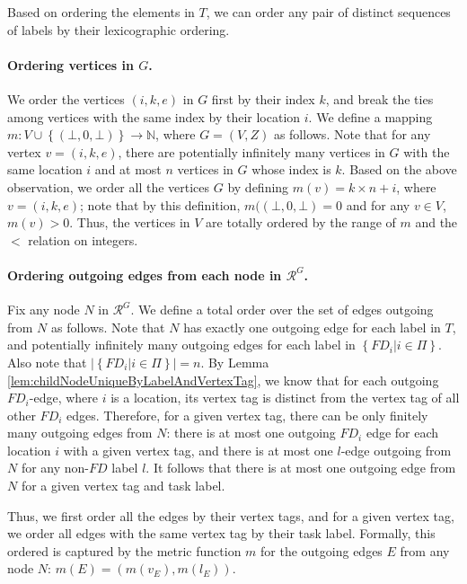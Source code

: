 \documentclass[11pt]{article}
\numberwithin{theorem}{section}
\newcommand{\set}[1]{\left\{#1\right\}}
\begin{document}
Based on ordering the elements in $T$, we can order any pair of distinct sequences of labels by their lexicographic ordering.

\paragraph{Ordering vertices in $G$.}
We order the vertices $(i,k,e)$ in $G$ first by their index $k$, and break the ties among vertices with the same index by their location $i$.
We define a mapping $m : V \cup \set{(\bot,0,\bot)} \rightarrow \mathbb{N}$, where $G = (V,Z)$ as follows. Note that for any vertex $v = (i,k,e)$, there are potentially infinitely many vertices in $G$ with the same location $i$ and at most $n$ vertices in $G$ whose index is $k$. Based on the above observation, we order all the vertices $G$ by defining $m(v) = k\times n + i$, where $v = (i,k,e)$; note that by this definition, $m((\bot, 0, \bot) = 0$ and for any $v \in V$, $m(v) > 0$. Thus, the vertices in $V$ are totally ordered by the range of $m$ and the $<$ relation on integers.

\paragraph{Ordering outgoing edges from each node in $\mathcal{R}^G$.}
Fix any node $N$ in $\mathcal{R}^G$. We define a total order over the set of edges outgoing from $N$ as follows. Note that $N$ has exactly one outgoing edge for each label in $T$, and potentially infinitely many outgoing edges for each label in $\set{FD_i | i \in \Pi}$. Also note that $|\set{FD_i | i \in \Pi}| = n$. By Lemma \ref{lem:childNodeUniqueByLabelAndVertexTag}, we know that for each outgoing $FD_i$-edge, where $i$ is a location, its vertex tag is distinct from the vertex tag of all other  $FD_i$ edges. Therefore, for a given vertex tag, there can be only finitely many outgoing edges from $N$: there is at most one outgoing $FD_i$ edge for each location $i$ with a given vertex tag, and there is at most one $l$-edge outgoing from $N$ for any non-$FD$ label $l$. It follows that there is at most one outgoing edge from $N$ for a given vertex tag and task label.

Thus, we first order all the edges by their vertex tags, and for a given vertex tag, we order all edges with the same vertex tag by their task label. Formally, this ordered is captured by the metric function $m$ for the outgoing edges $E$ from any node $N$: $m(E) = (m(v_E), m(l_E))$. 
\end{document}
